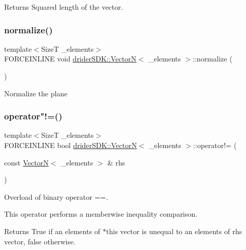 \begin{DoxyReturn}{Returns}
Squared length of the vector. 
\end{DoxyReturn}
\mbox{\label{classdrider_s_d_k_1_1_vector_n_aaab9e71b71c9f03ffd44e802f3872d0f}} 
\subsubsection{\texorpdfstring{normalize()}{normalize()}}
{\footnotesize\ttfamily template$<$SizeT \+\_\+elements$>$ \\
F\+O\+R\+C\+E\+I\+N\+L\+I\+NE void \hyperlink{classdrider_s_d_k_1_1_vector_n}{drider\+S\+D\+K\+::\+VectorN}$<$ \+\_\+elements $>$\+::normalize (\begin{DoxyParamCaption}{ }\end{DoxyParamCaption})\hspace{0.3cm}{\ttfamily [inline]}}

Normalize the plane \mbox{\label{classdrider_s_d_k_1_1_vector_n_a3cddf30e8751d5d6f926252e169979d2}} 
\subsubsection{\texorpdfstring{operator"!=()}{operator!=()}}
{\footnotesize\ttfamily template$<$SizeT \+\_\+elements$>$ \\
F\+O\+R\+C\+E\+I\+N\+L\+I\+NE bool \hyperlink{classdrider_s_d_k_1_1_vector_n}{drider\+S\+D\+K\+::\+VectorN}$<$ \+\_\+elements $>$\+::operator!= (\begin{DoxyParamCaption}\item[{const \hyperlink{classdrider_s_d_k_1_1_vector_n}{VectorN}$<$ \+\_\+elements $>$ \&}]{rhs }\end{DoxyParamCaption})\hspace{0.3cm}{\ttfamily [inline]}}

Overload of binary operator ==.

This operator performs a memberwise inequality comparison.

\begin{DoxyReturn}{Returns}
True if an elements of $\ast$this vector is unequal to an elements of rhs vector, false otherwise. 
\end{DoxyReturn}
\mbox{\label{classdrider_s_d_k_1_1_vector_n_a9a4739551cb0d3809b77432213dc174e}} 
